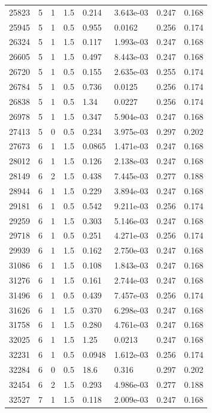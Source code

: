 \documentclass[preview]{standalone}
\begin{document}
{{{\begin{tabular}{L{1.2cm}C{1.2cm} C{0.3cm}C{0.5cm} C{1.4cm}C{1.4cm} C{1.4cm}C{1.4cm}}
  25823  &     5  & 1     & 1.5 &  0.214  & 3.643e-03  & 0.247 &  0.168   \\ 
  25945  &     5  & 1     & 0.5 &  0.955  & 0.0162  & 0.256 &  0.174   \\ 
  26324  &     5  & 1     & 1.5 &  0.117  & 1.993e-03  & 0.247 &  0.168   \\ 
  26605  &     5  & 1     & 1.5 &  0.497  & 8.443e-03  & 0.247 &  0.168   \\ 
  26720  &     5  & 1     & 0.5 &  0.155  & 2.635e-03  & 0.255 &  0.174   \\ 
  26784  &     5  & 1     & 0.5 &  0.736  & 0.0125  & 0.256 &  0.174   \\ 
  26838  &     5  & 1     & 0.5 &  1.34  & 0.0227  & 0.256 &  0.174   \\ 
  26978  &     5  & 1     & 1.5 &  0.347  & 5.904e-03  & 0.247 &  0.168   \\ 
  27413  &     5  & 0     & 0.5 &  0.234  & 3.975e-03  & 0.297 &  0.202   \\ 
  27673  &     6  & 1     & 1.5 &  0.0865  & 1.471e-03  & 0.247 &  0.168   \\ 
  28012  &     6  & 1     & 1.5 &  0.126  & 2.138e-03  & 0.247 &  0.168   \\ 
  28149  &     6  & 2     & 1.5 &  0.438  & 7.445e-03  & 0.277 &  0.188   \\ 
  28944  &     6  & 1     & 1.5 &  0.229  & 3.894e-03  & 0.247 &  0.168   \\ 
  29181  &     6  & 1     & 0.5 &  0.542  & 9.211e-03  & 0.256 &  0.174   \\ 
  29259  &     6  & 1     & 1.5 &  0.303  & 5.146e-03  & 0.247 &  0.168   \\ 
  29718  &     6  & 1     & 0.5 &  0.251  & 4.271e-03  & 0.256 &  0.174   \\ 
  29939  &     6  & 1     & 1.5 &  0.162  & 2.750e-03  & 0.247 &  0.168   \\ 
  31086  &     6  & 1     & 1.5 &  0.108  & 1.843e-03  & 0.247 &  0.168   \\ 
  31276  &     6  & 1     & 1.5 &  0.161  & 2.744e-03  & 0.247 &  0.168   \\ 
  31496  &     6  & 1     & 0.5 &  0.439  & 7.457e-03  & 0.256 &  0.174   \\ 
  31626  &     6  & 1     & 1.5 &  0.370  & 6.298e-03  & 0.247 &  0.168   \\ 
  31758  &     6  & 1     & 1.5 &  0.280  & 4.761e-03  & 0.247 &  0.168   \\ 
  32025  &     6  & 1     & 1.5 &  1.25  & 0.0213  & 0.247 &  0.168   \\ 
  32231  &     6  & 1     & 0.5 &  0.0948  & 1.612e-03  & 0.256 &  0.174   \\ 
  32284  &     6  & 0     & 0.5 &  18.6  & 0.316  & 0.297 &  0.202   \\ 
  32454  &     6  & 2     & 1.5 &  0.293  & 4.986e-03  & 0.277 &  0.188   \\ 
  32527  &     7  & 1     & 1.5 &  0.118  & 2.009e-03  & 0.247 &  0.168   \\ 
\hline 
\end{tabular} 

}}}
\end{document}
